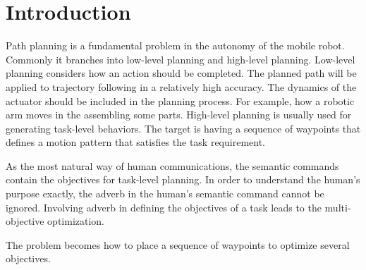 \section{Introduction}

Path planning is a fundamental problem in the autonomy of the mobile robot.
Commonly it branches into low-level planning and high-level planning.
Low-level planning considers how an action should be completed.
The planned path will be applied to trajectory following in a relatively high accuracy.
The dynamics of the actuator should be included in the planning process.
For example, how a robotic arm moves in the assembling some parts. 
High-level planning is usually used for generating task-level behaviors.
The target is having a sequence of waypoints that defines a motion pattern that satisfies the task requirement.

As the most natural way of human communications, the semantic commands contain the objectives for task-level planning.
In order to understand the human's purpose exactly, the adverb in the human's semantic command cannot be ignored.
Involving adverb in defining the objectives of a task leads to the multi-objective optimization.

The problem becomes how to place a sequence of waypoints to optimize several objectives.


